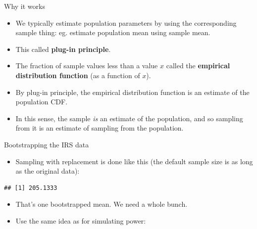 \documentclass[
  ignorenonframetext,
]{beamer}
\newenvironment{Shaded}{\begin{snugshade}}{\end{snugshade}}
\newcommand{\DataTypeTok}[1]{\textcolor[rgb]{0.13,0.29,0.53}{#1}}
\newcommand{\DecValTok}[1]{\textcolor[rgb]{0.00,0.00,0.81}{#1}}
\newcommand{\KeywordTok}[1]{\textcolor[rgb]{0.13,0.29,0.53}{\textbf{#1}}}
\newcommand{\NormalTok}[1]{#1}
\newcommand{\OperatorTok}[1]{\textcolor[rgb]{0.81,0.36,0.00}{\textbf{#1}}}
\newcommand{\StringTok}[1]{\textcolor[rgb]{0.31,0.60,0.02}{#1}}
\providecommand{\tightlist}{%
  \setlength{\itemsep}{0pt}\setlength{\parskip}{0pt}}
\begin{document}
\begin{frame}{Why it works}
\protect\hypertarget{why-it-works}{}

\begin{itemize}
\tightlist
\item
  We typically estimate population parameters by using the corresponding
  sample thing: eg. estimate population mean using sample mean.
\item
  This called \textbf{plug-in principle}.
\item
  The fraction of sample values less than a value \(x\) called the
  \textbf{empirical distribution function} (as a function of \(x\)).
\item
  By plug-in principle, the empirical distribution function is an
  estimate of the population CDF.
\item
  In this sense, the sample \emph{is} an estimate of the population, and
  so sampling from it is an estimate of sampling from the population.
\end{itemize}

\end{frame}

\begin{frame}[fragile]{Bootstrapping the IRS data}
\protect\hypertarget{bootstrapping-the-irs-data}{}

\begin{itemize}
\tightlist
\item
  Sampling with replacement is done like this (the default sample size
  is as long as the original data):
\end{itemize}

\begin{Shaded}
\end{Shaded}

\begin{verbatim}
## [1] 205.1333
\end{verbatim}

\begin{itemize}
\tightlist
\item
  That's one bootstrapped mean. We need a whole bunch.
\item
  Use the same idea as for simulating power:
\end{itemize}

\begin{Shaded}
\end{Shaded}

\end{frame}
\end{document}
